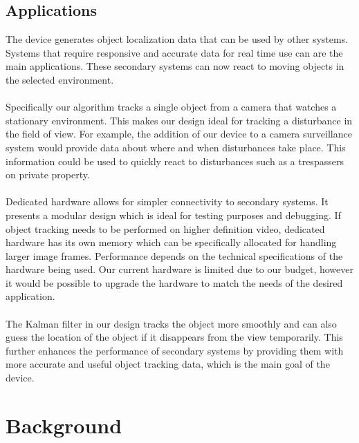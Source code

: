 \documentclass[12pt]{article} %
\begin{document}
\subsection{Applications}
The device generates object localization data that can be used by other systems. Systems that require responsive and accurate data for real time use can are the main applications. These secondary systems can now react to moving objects in the selected environment. \\\\
Specifically our algorithm tracks a single object from a camera that watches a stationary environment. This makes our design ideal for tracking a disturbance in the field of view. For example, the addition of our device to a camera surveillance system would provide data about where and when disturbances take place. This information could be used to quickly react to disturbances such as a trespassers on private property.\\\\
Dedicated hardware allows for simpler connectivity to secondary systems. It presents a modular design which is ideal for testing purposes and debugging. If object tracking needs to be performed on higher definition video, dedicated hardware has its own memory which can be specifically allocated for handling larger image frames. Performance depends on the technical specifications of the hardware being used. Our current hardware is limited due to our budget, however it would be possible to upgrade the hardware to match the needs of the desired application. \\\\
The Kalman filter in our design tracks the object more smoothly and can also guess the location of the object if it disappears from the view temporarily. This further enhances the performance of secondary systems by providing them with more accurate and useful object tracking data, which is the main goal of the device.
\section{Background}
\end{document}
